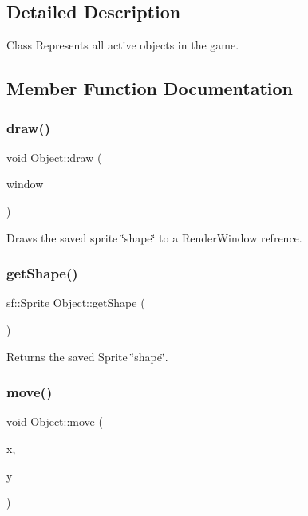 \subsection{Detailed Description}
Class Represents all active objects in the game. 

\subsection{Member Function Documentation}
\mbox{\label{classObject_a9e90592420891436fef1a41c42498e8b}} 
\subsubsection{\texorpdfstring{draw()}{draw()}}
{\footnotesize\ttfamily void Object\+::draw (\begin{DoxyParamCaption}\item[{sf\+::\+Render\+Window \&}]{window }\end{DoxyParamCaption})}

Draws the saved sprite \char`\"{}shape\char`\"{} to a Render\+Window refrence. \mbox{\label{classObject_ae38e77de9a92daab0e6fea8d3ba56fdd}} 
\subsubsection{\texorpdfstring{get\+Shape()}{getShape()}}
{\footnotesize\ttfamily sf\+::\+Sprite Object\+::get\+Shape (\begin{DoxyParamCaption}{ }\end{DoxyParamCaption})}

Returns the saved Sprite \char`\"{}shape\char`\"{}. \mbox{\label{classObject_a2cded255e6f55fb4542ca036450876f3}} 
\subsubsection{\texorpdfstring{move()}{move()}}
{\footnotesize\ttfamily void Object\+::move (\begin{DoxyParamCaption}\item[{float}]{x,  }\item[{float}]{y }\end{DoxyParamCaption})}

